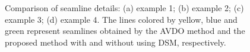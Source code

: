 \documentclass[journal]{IEEEtran}
\begin{document}
\begin{figure}[!t]
    \caption{Comparison of seamline details: (a) example 1; (b) example 2; (c) example 3; (d) example 4. The lines colored by yellow, blue and green represent seamlines obtained by the AVDO method \cite{Pan2009} and the proposed method with and without using DSM, respectively.}
    \label{fig:seamline-details-comparison}
\end{figure}
\end{document}
